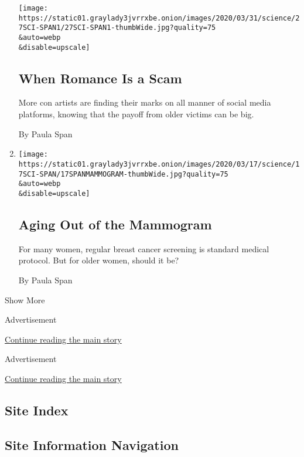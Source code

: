 \begin{enumerate}
  \texttt{[image: https://static01.graylady3jvrrxbe.onion/images/2020/03/31/science/27SCI-SPAN1/27SCI-SPAN1-thumbWide.jpg?quality=75\\\&auto=webp\\\&disable=upscale]}

  \hypertarget{when-romance-is-a-scam}{%
  \subsection{When Romance Is a Scam}\label{when-romance-is-a-scam}}

  More con artists are finding their marks on all manner of social media
  platforms, knowing that the payoff from older victims can be big.

  By Paula Span
\item
  \href{/2020/03/16/health/breastcancer-elderly-old-age.html}{}

  \texttt{[image: https://static01.graylady3jvrrxbe.onion/images/2020/03/17/science/17SCI-SPAN/17SPANMAMMOGRAM-thumbWide.jpg?quality=75\\\&auto=webp\\\&disable=upscale]}

  \hypertarget{aging-out-of-the-mammogram}{%
  \subsection{Aging Out of the
  Mammogram}\label{aging-out-of-the-mammogram}}

  For many women, regular breast cancer screening is standard medical
  protocol. But for older women, should it be?

  By Paula Span
\end{enumerate}

Show More

Advertisement

\protect\hyperlink{after-mid1}{Continue reading the main story}

Advertisement

\protect\hyperlink{after-mktg}{Continue reading the main story}

\hypertarget{site-index}{%
\subsection{Site Index}\label{site-index}}

\hypertarget{site-information-navigation}{%
\subsection{Site Information
Navigation}\label{site-information-navigation}}

